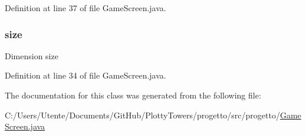 Definition at line 37 of file Game\+Screen.\+java.

\mbox{\label{classprogetto_1_1_game_screen_a743d9d70d0b79689cc75dfc44137cc48}} 
\subsubsection{\texorpdfstring{size}{size}}
{\footnotesize\ttfamily Dimension size\hspace{0.3cm}{\ttfamily [private]}}



Definition at line 34 of file Game\+Screen.\+java.



The documentation for this class was generated from the following file\+:\begin{DoxyCompactItemize}
\item 
C\+:/\+Users/\+Utente/\+Documents/\+Git\+Hub/\+Plotty\+Towers/progetto/src/progetto/\hyperlink{_game_screen_8java}{Game\+Screen.\+java}\end{DoxyCompactItemize}
